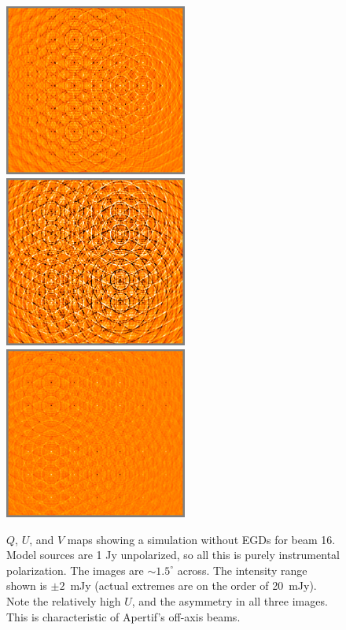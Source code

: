 \documentclass[10pt]{article}
\begin{document}
\begin{figure}
\includegraphics[width=6cm]{q15}%
\includegraphics[width=6cm]{u15}%
\includegraphics[width=6cm]{v15}
\caption{\label{fig:quv}$Q$, $U$, and $V$ maps showing a simulation without EGDs for beam 16. Model sources are 1 Jy unpolarized, so all this is purely instrumental polarization. The images are $\sim1.5^\circ$ across. The intensity range shown is $\pm2$~mJy (actual extremes are on the order of 20~mJy). Note the relatively high $U$, and the asymmetry in all three images. This is characteristic of Apertif's off-axis beams.}
\end{figure}
\end{document}

